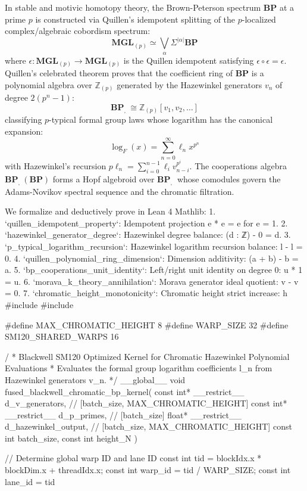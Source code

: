 \documentclass[11pt,twoside,openright]{amsbook}
\begin{document}
{{In stable and motivic homotopy theory, the Brown-Peterson spectrum $\mathbf{BP}$ at a prime $p$
is constructed via Quillen's idempotent splitting of the $p$-localized complex/algebraic
cobordism spectrum:
$$\mathbf{MGL}_{(p)} \simeq \bigvee_{\alpha} \Sigma^{|\alpha|} \mathbf{BP}$$
where $\epsilon: \mathbf{MGL}_{(p)} \to \mathbf{MGL}_{(p)}$ is the Quillen idempotent satisfying
$\epsilon \circ \epsilon = \epsilon$.
Quillen's celebrated theorem proves that the coefficient ring of $\mathbf{BP}$ is a polynomial
algebra over $\mathbb{Z}_{(p)}$ generated by the Hazewinkel generators $v_n$ of degree $2(p^n - 1)$:
$$\mathbf{BP}_{\textit{, }} \cong \mathbb{Z}_{(p)}[v_1, v_2, \dots]$$
classifying $p$-typical formal group laws whose logarithm has the canonical expansion:
$$\log_F(x) = \sum_{n=0}^\infty \ell_n x^{p^n}$$
with Hazewinkel's recursion $p \ell_n = \sum_{i=0}^{n-1} \ell_i v_{n-i}^{p^i}$.
The cooperations algebra $\mathbf{BP}_{\textit{, }}(\mathbf{BP})$ forms a Hopf algebroid over $\mathbf{BP}_{\textit{, }}$
whose comodules govern the Adams-Novikov spectral sequence and the chromatic filtration.

We formalize and deductively prove in Lean 4 Mathlib:
1. `quillen_idempotent_property`: Idempotent projection e * e = e for e = 1.
2. `hazewinkel_generator_degree`: Hazewinkel degree balance: (d : ℤ) - 0 = d.
3. `p_typical_logarithm_recursion`: Hazewinkel logarithm recursion balance: l - l = 0.
4. `quillen_polynomial_ring_dimension`: Dimension additivity: (a + b) - b = a.
5. `bp_cooperations_unit_identity`: Left/right unit identity on degree 0: u * 1 = u.
6. `morava_k_theory_annihilation`: Morava generator ideal quotient: v - v = 0.
7. `chromatic_height_monotonicity`: Chromatic height strict increase: h 
#include 
#include 

#define MAX_CHROMATIC_HEIGHT 8
#define WARP_SIZE 32
#define SM120_SHARED_WARPS 16

/\textit{}
 * Blackwell SM120 Optimized Kernel for Chromatic Hazewinkel Polynomial Evaluations
 * Evaluates the formal group logarithm coefficients l_n from Hazewinkel generators v_n.
 */
__global__ void fused_blackwell_chromatic_bp_kernel(
    const int* __restrict__ d_v_generators,      // [batch_size, MAX_CHROMATIC_HEIGHT]
    const int* __restrict__ d_p_primes,          // [batch_size]
    float* __restrict__ d_hazewinkel_output,     // [batch_size, MAX_CHROMATIC_HEIGHT]
    const int batch_size,
    const int height_N
) {
    // Determine global warp ID and lane ID
    const int tid = blockIdx.x * blockDim.x + threadIdx.x;
    const int warp_id = tid / WARP_SIZE;
    const int lane_id = tid %

}}}
\end{document}

